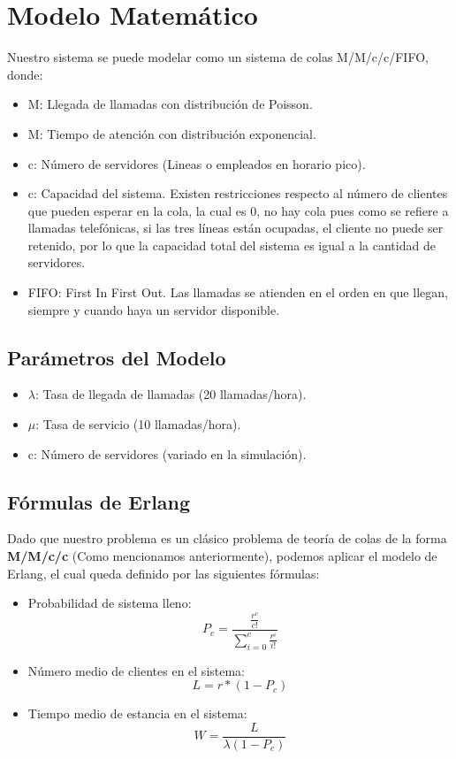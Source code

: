 \documentclass{article}
\begin{document}
\section{Modelo Matemático}

Nuestro sistema se puede modelar como un sistema de colas M/M/c/c/FIFO, donde:

\begin{itemize}
    \item M: Llegada de llamadas con distribución de Poisson.
    \item M: Tiempo de atención con distribución exponencial.
    \item c: Número de servidores (Lineas o empleados en horario pico).
    \item c: Capacidad del sistema. Existen restricciones respecto al número de clientes que pueden esperar en la cola, la cual es 0, no hay cola pues como se refiere a llamadas telefónicas, si las tres líneas están ocupadas, el cliente no puede ser retenido, por lo que la capacidad total del sistema es igual a la cantidad de servidores.
    \item FIFO: First In First Out. Las llamadas se atienden en el orden en que llegan, siempre y cuando haya un servidor disponible.
\end{itemize}


\subsection{Parámetros del Modelo}

\begin{itemize}
    \item $\lambda$: Tasa de llegada de llamadas (20 llamadas/hora).
    \item $\mu$: Tasa de servicio (10 llamadas/hora).
    \item c: Número de servidores (variado en la simulación).
\end{itemize}

\subsection{Fórmulas de Erlang}

Dado que nuestro problema es un clásico problema de teoría de colas de la forma \textbf{M/M/c/c} (Como mencionamos anteriormente), podemos aplicar el modelo de Erlang, el cual queda definido por las siguientes fórmulas:

\begin{itemize}
    \item Probabilidad de sistema lleno: 
    \[
    P_c = \frac{\frac{r^c}{c!}}{\sum_{i=0}^{c} \frac{r^i}{i!}}
    \]
    \item Número medio de clientes en el sistema: 
    \[
    L = r*(1- P_c)
    \]
    \item Tiempo medio de estancia en el sistema: 
    \[
    W = \frac{L}{\lambda (1 - P_c)}
    \]
\end{itemize}
\end{document}
